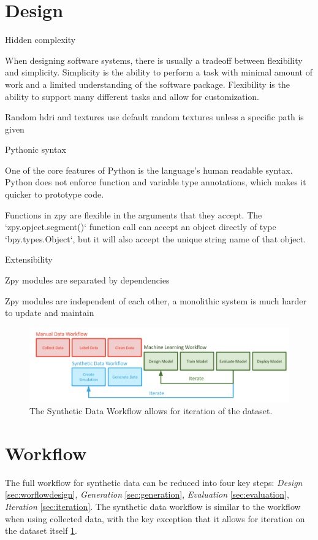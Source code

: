 \documentclass{article}
\begin{document}
\section{Design}
\label{sec:design}

Hidden complexity

When designing software systems, there is usually a tradeoff between flexibility and simplicity. Simplicity is the ability to perform a task with minimal amount of work and a limited understanding of the software package. Flexibility is the ability to support many different tasks and allow for customization.

Random hdri and textures use default random textures unless a specific path is given

Pythonic syntax

One of the core features of Python is the language’s human readable syntax. Python does not enforce function and variable type annotations, which makes it quicker to prototype code.

Functions in zpy are flexible in the arguments that they accept. The `zpy.opject.segment()` function call can accept an object directly of type `bpy.types.Object`, but it will also accept the unique string name of that object. 

Extensibility

Zpy modules are separated by dependencies

Zpy modules are independent of each other, a monolithic system is much harder to update and maintain


\begin{figure}
	\centering
	\includegraphics[width=\textwidth]{workflow.png}
	\caption{The Synthetic Data Workflow allows for iteration of the dataset.}
	\label{fig:workflow}
\end{figure}

\section{Workflow}
\label{sec:workflow}

The full workflow for synthetic data can be reduced into four key steps: \emph{Design} \ref{sec:worflowdesign}, \emph{Generation} \ref{sec:generation}, \emph{Evaluation} \ref{sec:evaluation}, \emph{Iteration} \ref{sec:iteration}. The synthetic data workflow is similar to the workflow when using collected data, with the key exception that it allows for iteration on the dataset itself \ref{fig:workflow}.
\end{document}
